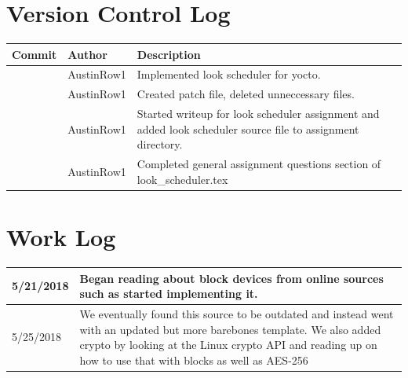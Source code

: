 \documentclass[onecolumn,draftclsnofoot, 10pt, compsoc]{IEEEtran}
\begin{document}
	
	\section{Version Control Log}
	\begin{tabular}{|p{5cm}|p{5cm}|p{5cm}|}
		\hline
		\textbf{Commit} & \textbf{Author} & \textbf{Description}\\
		\hline
		\textcolor{blue}{\underline{\href[pdfnewwindow=true]{https://github.com/AustinRow1/OperatingSystems2/commit/fad3a1690038d1785a07071dea724c7fa74d0846}{fad3a16}}} & AustinRow1 & Implemented look scheduler for yocto.\\\hline
		\textcolor{blue}{\underline{\href[pdfnewwindow=true]{https://github.com/AustinRow1/OperatingSystems2/commit/0e9906640572cc0be52dbe039061e91fa5622da1}{0e99066}}} & AustinRow1 & Created patch file, deleted unneccessary files.\\\hline
		\textcolor{blue}{\underline{\href[pdfnewwindow=true]{https://github.com/AustinRow1/OperatingSystems2/commit/a98b7c18aa474b141b50f364620e2b76a3790157}{a98b7c1}}} & AustinRow1 & Started writeup for look scheduler assignment and added look scheduler source file to assignment directory.\\\hline
		\textcolor{blue}{\underline{\href[pdfnewwindow=true]{https://github.com/AustinRow1/OperatingSystems2/commit/297ac1df3960a66e565b1b62f6dfe6fcc8adce48}{297ac1d}}} & AustinRow1 & Completed general assignment questions section of look\_scheduler.tex\\\hline\end{tabular}
	
	
	\section{Work Log}
	\begin{center}
		\begin{tabular}{ |p{2cm}|p{12cm}| }
			\hline
			5/21/2018 & Began reading about block devices from online sources such as \cite{block-drivers} started implementing it. 
			\\ \hline
			5/25/2018 & We eventually found this source to be outdated and instead went with an updated but more barebones template\cite{driver-template}. We also added crypto by looking at the Linux crypto API\cite{crypto-api} and reading up on how to use that with blocks\cite{block-crypto} as well as AES-256\cite{AES-256}\\
			\hline
		\end{tabular}
	\end{center}
	
	
	\bibdata{}
	
	
	
\end{document}
